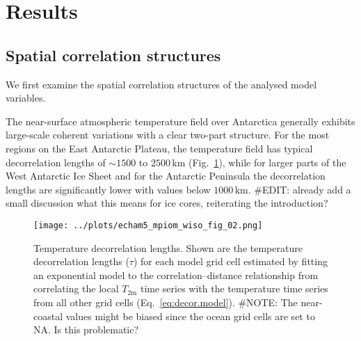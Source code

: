 \documentclass[cp, manuscript]{copernicus}
\begin{document}
\section{Results}\label{results}

\subsection{Spatial correlation structures}\label{results:cor.struct}

We first examine the spatial correlation structures of the analysed model
variables.


The near-surface atmospheric temperature field over Antarctica generally
exhibits large-scale coherent variations with a clear two-part structure. For
the most regions on the East Antarctic Plateau, the temperature field has
typical decorrelation lengths of $\sim1500$ to $2500$\,km
(Fig.~\ref{fig:decor.lengths}), while for larger parts of the West Antarctic Ice
Sheet and for the Antarctic Peninsula the decorrelation lengths are
significantly lower with values below $1000$\,km. \#EDIT: already add a small
discussion what this means for ice cores, reiterating the introduction?

\begin{figure}[t]%
\centering
\texttt{[image: ../plots/echam5\_mpiom\_wiso\_fig\_02.png]}
\caption[Decorrelation lengths]{%
  Temperature decorrelation lengths. Shown are the temperature decorrelation
  lengths ($\tau$) for each model grid cell estimated by fitting an exponential
  model to the correlation--distance relationship from correlating the local
  $T_{2\mathrm{m}}$ time series with the temperature time series from all other
  grid cells (Eq.~\ref{eq:decor.model}). \#NOTE: The near-coastal values might
  be biased since the ocean grid cells are set to NA. Is this problematic?}
\label{fig:decor.lengths}%
\end{figure}%
\end{document}
